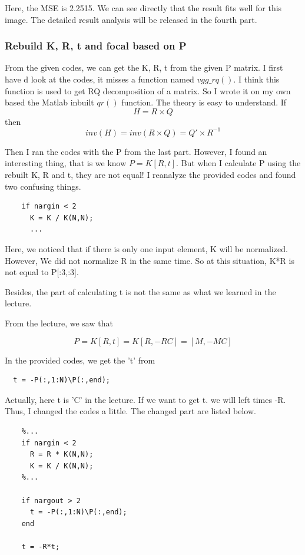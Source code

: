 \documentclass{article}
\begin{document}
Here, the MSE is 2.2515. We can see directly that the result fits well for this image. The detailed result analysis will be released in the fourth part.

\subsubsection*{Rebuild K, R, t and focal based on P}
From the given codes, we can get the K, R, t from the given P matrix. I first have d look at the codes, it misses a function named $vgg\_rq()$. I think this function is used to get RQ decomposition of a matrix. So I wrote it on my own based the Matlab inbuilt $qr()$ function. The theory is easy to understand. If 
$$H = R\times Q$$
then $$inv(H) = inv(R\times Q) = Q'\times R^{-1}$$ 

Then I ran the codes with the P from the last part. However, I found an interesting thing, that is we know $P = K[R,t]$. But when I calculate P using the rebuilt K, R and t, they are not equal! I reanalyze the provided codes and found two confusing things.

\begin{lstlisting}
    if nargin < 2
      K = K / K(N,N);
      ...
\end{lstlisting}

Here, we noticed that if there is only one input element, K will be normalized. However, We did not normalize R in the same time. So at this situation, K*R is not equal to P[:3,:3].

Besides, the part of calculating t is not the same as what we learned in the lecture. 

From the lecture, we saw that 

$$P = K [R, t] = K[R, -RC] = [M, -MC]$$

In the provided codes, we get the 't' from

\begin{lstlisting}
  t = -P(:,1:N)\P(:,end);
\end{lstlisting}

Actually, here t is 'C' in the lecture. If we want to get t. we will left times -R. Thus, I changed the codes a little. The changed part are listed below.

\begin{lstlisting}
    %...
    if nargin < 2
      R = R * K(N,N);
      K = K / K(N,N);
    %...
    
    if nargout > 2
      t = -P(:,1:N)\P(:,end);
    end

    t = -R*t;
\end{lstlisting}
\end{document}
